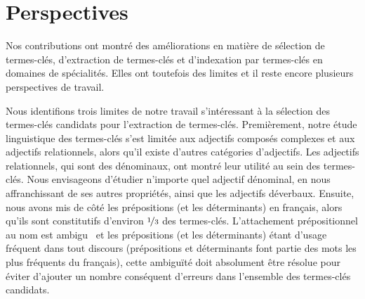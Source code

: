   \section{Perspectives}
  \label{sec:main-conclusion-contributions}
    Nos contributions ont montré des améliorations en matière de sélection de
    termes-clés, d'extraction de termes-clés et d'indexation par termes-clés en
    domaines de spécialités. Elles ont toutefois des limites et il reste encore
    plusieurs perspectives de travail.

    Nous identifions trois limites de notre travail s'intéressant à la sélection
    des termes-clés candidats pour l'extraction de termes-clés. Premièrement,
    notre étude linguistique des termes-clés s'est limitée aux adjectifs
    composés complexes et aux adjectifs relationnels, alors qu'il existe
    d'autres catégories d'adjectifs. Les adjectifs relationnels, qui sont des
    dénominaux, ont montré leur utilité au sein des termes-clés. Nous
    envisageons d'étudier n'importe quel adjectif dénominal, en nous
    affranchissant de ses autres propriétés, ainsi que les adjectifs déverbaux.
    Ensuite, nous avons mis de côté les prépositions (et les déterminants) en
    français, alors qu'ils sont constitutifs d'environ $\unitfrac{1}{3}$ des
    termes-clés. L'attachement prépositionnel au nom est
    ambigu~\cite{colonna2002ambiguitesyntaxique} et les prépositions (et les
    déterminants) étant d'usage fréquent dans tout discours (prépositions et
    déterminants font partie des mots les plus fréquents du français), cette
    ambiguïté doit absolument être résolue pour éviter d'ajouter un nombre
    conséquent d'erreurs dans l'ensemble des termes-clés candidats.


